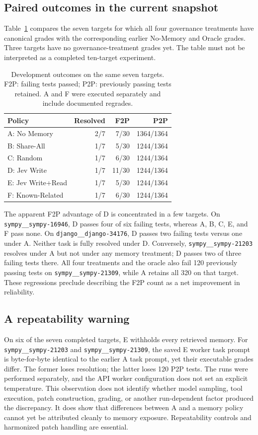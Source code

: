 \documentclass[sigconf,anonymous]{aamas}
\begin{document}
\subsection{Paired outcomes in the current snapshot}
Table~\ref{tab:pilot} compares the seven targets for which all four governance treatments have canonical grades with the corresponding earlier No-Memory and Oracle grades. Three targets have no governance-treatment grades yet. The table must not be interpreted as a completed ten-target experiment.

\begin{table}[t]
\caption{Development outcomes on the same seven targets. F2P: failing tests passed; P2P: previously passing tests retained. A and F were executed separately and include documented regrades.}
\label{tab:pilot}
\centering
\begin{tabular}{lrrr}
\hline
Policy & Resolved & F2P & P2P \\
\hline
A: No Memory & 2/7 & 7/30 & 1364/1364\\
B: Share-All & 1/7 & 5/30 & 1244/1364\\
C: Random & 1/7 & 6/30 & 1244/1364\\
D: Jev Write & 1/7 & 11/30 & 1244/1364\\
E: Jev Write+Read & 1/7 & 5/30 & 1244/1364\\
F: Known-Related & 1/7 & 6/30 & 1244/1364\\
\hline
\end{tabular}
\end{table}

The apparent F2P advantage of D is concentrated in a few targets. On \texttt{sympy\_\_sympy-16946}, D passes four of six failing tests, whereas A, B, C, E, and F pass none. On \texttt{django\_\_django-34176}, D passes two failing tests versus one under A. Neither task is fully resolved under D. Conversely, \texttt{sympy\_\_sympy-21203} resolves under A but not under any memory treatment; D passes two of three failing tests there. All four treatments and the oracle also fail 120 previously passing tests on \texttt{sympy\_\_sympy-21309}, while A retains all 320 on that target. These regressions preclude describing the F2P count as a net improvement in reliability.

\subsection{A repeatability warning}
On six of the seven completed targets, E withholds every retrieved memory. For \texttt{sympy\_\_sympy-21203} and \texttt{sympy\_\_sympy-21309}, the saved E worker task prompt is byte-for-byte identical to the earlier A task prompt, yet their executable grades differ. The former loses resolution; the latter loses 120 P2P tests. The runs were performed separately, and the API worker configuration does not set an explicit temperature. This observation does not identify whether model sampling, tool execution, patch construction, grading, or another run-dependent factor produced the discrepancy. It does show that differences between A and a memory policy cannot yet be attributed cleanly to memory exposure. Repeatability controls and harmonized patch handling are essential.
\end{document}
